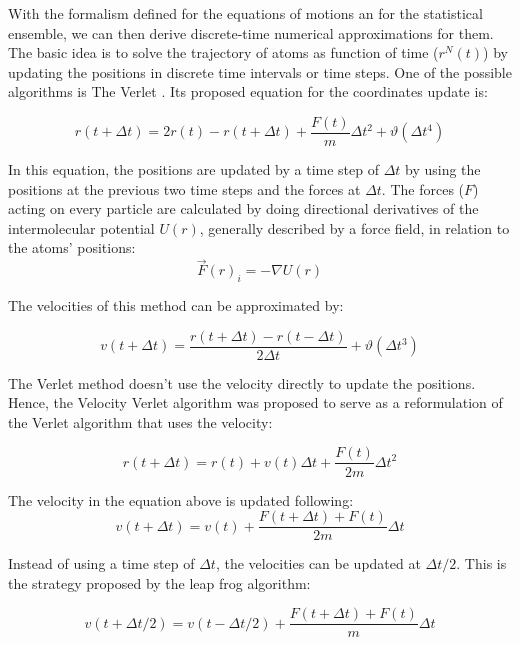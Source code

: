 With the formalism defined for the equations of motions an for the statistical ensemble, we can then derive discrete-time numerical approximations for them.  The basic idea is to solve the trajectory of atoms as function of time ($r^{N}(t)$) by updating the positions in discrete time intervals or time steps. One of the possible algorithms is The Verlet \cite{verlet}. Its proposed equation for the coordinates update is:  

\begin{equation}
r(t+ \Delta t) = 2r(t) - r(t+ \Delta t) + \frac{F(t)}{m} \Delta t^{2} +\vartheta (\Delta t^{4})
\end{equation}

In this equation, the positions are updated by a time step of $\Delta t$ by using the positions at the previous two time steps and the forces at $\Delta t$. The forces ($F$) acting on every particle are calculated by doing directional derivatives of the intermolecular potential $U(r)$, generally described by a force field, in relation to the atoms' positions:
\begin{equation}
\label{eq:forces}
\vec{F }(r)_{i} =  - \nabla U(r)
\end{equation}

The velocities of this method can be approximated by:

\begin{equation}
v(t+ \Delta t) = \frac{r(t+ \Delta t) - r(t- \Delta t)}{2 \Delta t} +\vartheta (\Delta t^{3})
\end{equation}

The Verlet method doesn't use the velocity directly to update the positions. Hence, the Velocity Verlet algorithm was proposed to serve as a reformulation of the Verlet algorithm that uses the velocity: 

\begin{equation}
r(t+ \Delta t) = r(t) +v(t) \Delta t + \frac{F(t)}{2m} \Delta t^{2}
\end{equation}

The velocity in the equation above is updated following:
\begin{equation}
v(t+ \Delta t) = v(t) +\frac{F(t+ \Delta t) +F(t)}{2m} \Delta t
\end{equation}

Instead of using a time step of $\Delta t$, the velocities can be updated at $\Delta t /2$. This is the strategy proposed by the leap frog algorithm:

\begin{equation}
v(t+ \Delta t /2) = v(t- \Delta t /2) +\frac{F(t+ \Delta t) +F(t)}{m} \Delta t
\end{equation}

